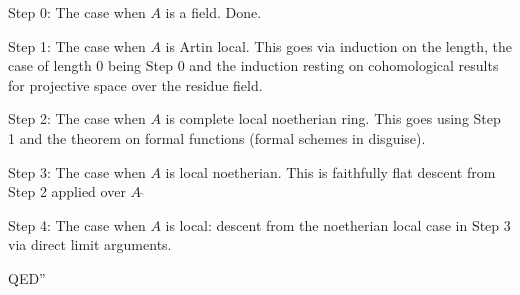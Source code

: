  Step 0: The case when $A$ is a field. Done.

 \medskip

 Step 1: The case when $A$ is Artin local.
 This goes via induction on the length, the case of length $0$ being Step $0$
 and the induction resting on cohomological results for projective space over the residue field.

  \medskip

 Step 2: The case when $A$ is complete local noetherian ring. This goes
 using Step 1 and the theorem on formal functions (formal schemes in disguise).

  \medskip

 Step 3: The case when $A$ is local noetherian.
 This is faithfully flat descent from Step 2 applied over $A~\widehat{}$

 \medskip
 
 Step 4: The case when $A$ is local:
 descent from the noetherian local case in Step 3 via direct limit arguments.

\medskip
 
QED''
